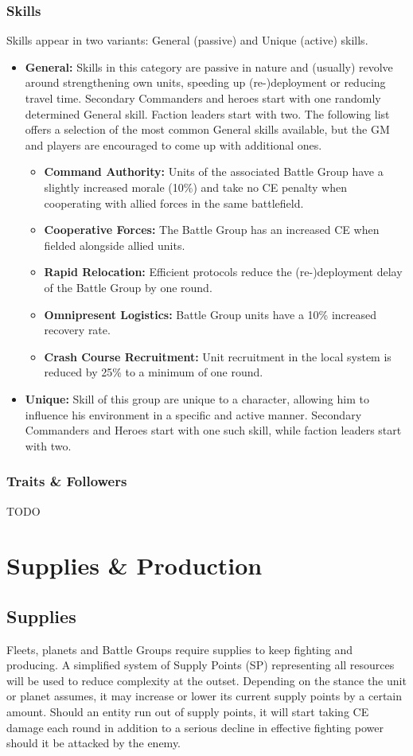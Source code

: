 \subsection{Skills}
Skills appear in two variants: General (passive) and Unique (active) skills.
\begin{itemize}
	\item \textbf{General:} Skills in this category are passive in nature and (usually) revolve around strengthening own units, speeding up (re-)deployment or reducing travel time. Secondary Commanders and heroes start with one randomly determined General skill. Faction leaders start with two. The following list offers a selection of the most common General skills available, but the GM and players are encouraged to come up with additional ones.
	\begin{itemize}
		\item \textbf{Command Authority:} Units of the associated Battle Group have a slightly increased morale (10\%) and take no CE penalty when cooperating with allied forces in the same battlefield.
		\item \textbf{Cooperative Forces:} The Battle Group has an increased CE when fielded alongside allied units.
		\item \textbf{Rapid Relocation:} Efficient protocols reduce the (re-)deployment delay of the Battle Group by one round.
		\item \textbf{Omnipresent Logistics:} Battle Group units have a 10\% increased recovery rate.
		\item \textbf{Crash Course Recruitment:} Unit recruitment in the local system is reduced by 25\% to a minimum of one round.
	\end{itemize}
	\item \textbf{Unique:} Skill of this group are unique to a character, allowing him to influence his environment in a specific and active manner. Secondary Commanders and Heroes start with one such skill, while faction leaders start with two.
\end{itemize}

\subsection{Traits \& Followers}
TODO


\chapter{Supplies \& Production}
\section{Supplies}
Fleets, planets and Battle Groups require supplies to keep fighting and producing. 
A simplified system of Supply Points (SP) representing all resources will be used to reduce complexity at the outset.
Depending on the stance the unit or planet assumes, it may increase or lower its current supply points by a certain amount.
Should an entity run out of supply points, it will start taking CE damage each round in addition to a serious decline in effective fighting power should it be attacked by the enemy.


